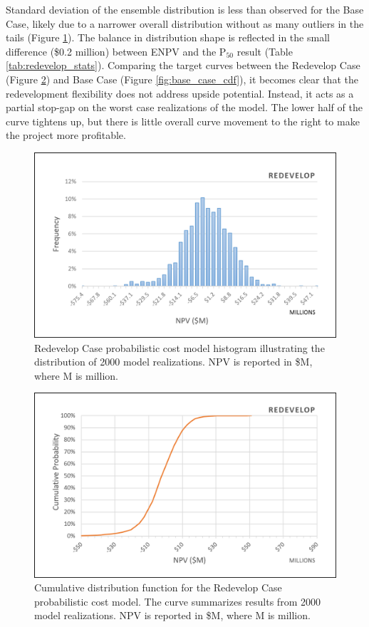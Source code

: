 Standard deviation of the ensemble distribution is less than observed for the Base Case, likely due to a narrower overall distribution without as many outliers in the tails (Figure \ref{fig:redevelop_case_hist}). The balance in distribution shape is reflected in the small difference (\$0.2 million) between ENPV and the P$_{50}$ result (Table \ref{tab:redevelop_stats}). Comparing the target curves between the Redevelop Case (Figure \ref{fig:redevelop_case_cdf}) and Base Case (Figure \ref{fig:base_case_cdf}), it becomes clear that the redevelopment flexibility does not address upside potential. Instead, it acts as a partial stop-gap on the worst case realizations of the model. The lower half of the curve tightens up, but there is little overall curve movement to the right to make the project more profitable.

\begin{figure}[!htp]
\centering
\includegraphics[width=.85\textwidth]{templates/images/Figure-Redevelop_Case_Histogram.png}
\caption[Redevelop Case histogram]{Redevelop Case probabilistic cost model histogram illustrating the distribution of 2000 model realizations. NPV is reported in \$M, where M is million.}
\label{fig:redevelop_case_hist}
\end{figure}

\begin{figure}[!htp]
\centering
\includegraphics[width=.85\textwidth]{templates/images/Figure-Redevelop_Case_CDF.png}
\caption[Redevelop Case CDF]{Cumulative distribution function for the Redevelop Case probabilistic cost model. The curve summarizes results from 2000 model realizations. NPV is reported in \$M, where M is million.}
\label{fig:redevelop_case_cdf}
\end{figure}

